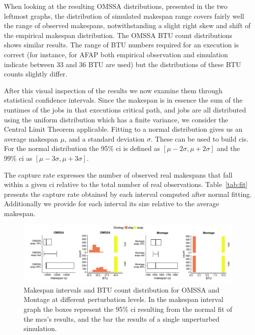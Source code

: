 \documentclass[10pt,conference,compsocconf]{IEEEtran}
\begin{document}
When looking at the resulting OMSSA distributions, presented in the two leftmost
graphs,  the distribution  of simulated  makespan range  covers fairly  well the
range of  observed makespans, notwithstanding a  slight right skew and  shift of
the empirical  makespan distribution.  The  OMSSA BTU count  distributions shows
similar results.  The range of BTU  numbers required for an execution is correct
(for  instance, for  AFAP  both empirical  observation  and simulation  indicate
between  33 and  36 BTU  are used)  but the  distributions of  these BTU  counts
slightly differ.


After  this  visual inspection  of  the  results  we  now examine  them  through
statistical confidence intervals.   Since the makespan is in essence  the sum of
the runtimes  of the  jobs in that  executions critical path,  and jobs  are all
distributed  using the  uniform distribution  which  has a  finite variance,  we
consider the Central Limit Theorem applicable.  Fitting to a normal distribution
gives us an average makespan $\mu{}$, and a standard deviation $\sigma{}$. These
can be used to  build \acp{ci}. For the normal distribution  the 95\% \ac{ci} is
defined  as   $[\mu{}-2\sigma{},\mu{}+2\sigma{}]$  and   the  99\%   \ac{ci}  as
$[\mu{}-3\sigma{},\mu{}+3\sigma{}]$.

The capture rate expresses the number of observed real makespans that fall
within a given \ac{ci} relative to the total number of real observations.
Table~\ref{tab:fit} presents the capture rate obtained by each interval computed
after normal fitting.  Additionally we provide for each interval its size
relative to the average makespan.

\begin{figure}
	\includegraphics[width=\textwidth]{gfx/int_plot.pdf}
	\caption{Makespan intervals and BTU count distribution for OMSSA and 
	Montage at different perturbation levels. In the makespan interval graph 
	the boxes represent the 95\% \ac{ci} resulting from the normal fit of the
	\acs{mcs}'s results, and the bar the results of a single unperturbed 
	simulation.}\label{fig:int}
\end{figure}
\end{document}
